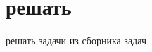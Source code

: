 \documentclass[a4paper,10pt]{article}
\begin{document}
\section*{решать}
 решать задачи из сборника задач
\end{document}
